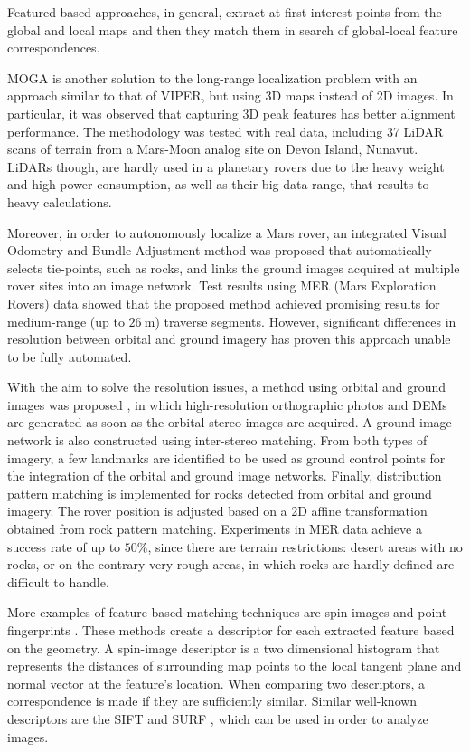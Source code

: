 Featured-based approaches, in general, extract at first interest points
from the global and local maps and then they match them in search of
global-local feature correspondences.

MOGA \parencite{Carle2010} is another solution to the long-range localization
problem with an approach similar to that of VIPER, but using 3D maps
instead of 2D images.
In particular, it was observed that capturing 3D peak features has
better alignment performance.
The methodology was tested with real data, including 37 LiDAR scans of
terrain from a Mars-Moon analog site on Devon Island, Nunavut.
LiDARs though, are hardly used in a planetary rovers due to the heavy
weight and high power consumption, as well as their big data range,
that results to heavy calculations.

Moreover, in order to autonomously localize a Mars rover,
an integrated Visual Odometry and Bundle Adjustment method \parencite{Li2007}
was proposed that automatically selects tie-points, such as rocks,
and links the ground images acquired at multiple rover sites into
an image network.
Test results using MER (Mars Exploration Rovers) data showed that the
proposed method achieved promising results for medium-range (up to
$\SI{26}{\m}$) traverse segments.
However, significant differences in resolution between orbital and
ground imagery has proven this approach unable to be fully automated.

With the aim to solve the resolution issues, a method using orbital and
ground images was proposed \parencite{Hwangbo2009}, in which
high-resolution orthographic photos and DEMs are generated as soon as the
orbital stereo images are acquired.
A ground image network is also constructed using inter-stereo matching.
From both types of imagery, a few landmarks are identified to be used as
ground control points for the integration of the orbital and ground
image networks.
Finally, distribution pattern matching is implemented for rocks detected
from orbital and ground imagery.
The rover position is adjusted based on a 2D affine transformation
obtained from rock pattern matching.
Experiments in MER data achieve a success rate of up to $50\%$, since
there are terrain restrictions: desert areas with no rocks,
or on the contrary very rough areas, in which rocks are hardly
defined are difficult to handle.

More examples of feature-based matching techniques are spin images
\parencite{Johnson1997} and point fingerprints \parencite{Sun2003}.
These methods create a descriptor for each extracted feature based on the
geometry.
A spin-image descriptor is a two dimensional histogram that
represents the distances of surrounding map points to the local tangent
plane and normal vector at the feature’s location.
When comparing two descriptors, a correspondence is made if they are
sufficiently similar.
Similar well-known descriptors are the SIFT \parencite{Lowe2004}
and SURF \parencite{Bay2006}, which can be used in order to analyze images.

